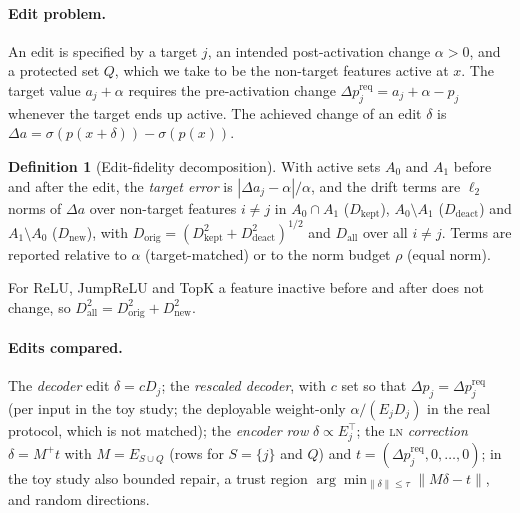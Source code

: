 \documentclass{article}
\theoremstyle{plain}
\theoremstyle{definition}
\newtheorem{definition}[theorem]{Definition}
\theoremstyle{remark}
\newcommand{\LN}{\textsc{ln}}
\begin{document}
\paragraph{Edit problem.}
An edit is specified by a target $j$, an intended post-activation change $\alpha>0$, and a
protected set $Q$, which we take to be the non-target features active at $x$. The target
value $a_j+\alpha$ requires the pre-activation change
$\Delta p_j^{\mathrm{req}} = a_j + \alpha - p_j$ whenever the target ends up active. The
achieved change of an edit $\delta$ is $\Delta a = \sigma(p(x+\delta)) - \sigma(p(x))$.

\begin{definition}[Edit-fidelity decomposition]
\label{def:fidelity}
With active sets $A_0$ and $A_1$ before and after the edit, the \emph{target error} is
$|\Delta a_j - \alpha|/\alpha$, and the drift terms are $\ell_2$ norms of $\Delta a$ over
non-target features $i\neq j$ in $A_0\cap A_1$ ($D_{\mathrm{kept}}$), $A_0\setminus A_1$
($D_{\mathrm{deact}}$) and $A_1\setminus A_0$ ($D_{\mathrm{new}}$), with
$D_{\mathrm{orig}} = (D_{\mathrm{kept}}^2 + D_{\mathrm{deact}}^2)^{1/2}$ and $D_{\mathrm{all}}$
over all $i\neq j$. Terms are reported relative to $\alpha$ (target-matched) or to the norm
budget $\rho$ (equal norm).
\end{definition}
For ReLU, JumpReLU and TopK a feature inactive before and after does not change, so
$D_{\mathrm{all}}^2 = D_{\mathrm{orig}}^2 + D_{\mathrm{new}}^2$.

\paragraph{Edits compared.} The \emph{decoder} edit $\delta = cD_j$; the \emph{rescaled
decoder}, with $c$ set so that $\Delta p_j = \Delta p_j^{\mathrm{req}}$ (per input in the toy
study; the deployable weight-only $\alpha/(E_jD_j)$ in the real protocol, which is not
matched); the \emph{encoder row} $\delta\propto E_j^{\top}$; the \LN{} \emph{correction}
$\delta = M^{+}t$ with $M = E_{S\cup Q}$ (rows for $S=\{j\}$ and $Q$) and
$t = (\Delta p_j^{\mathrm{req}},0,\dots,0)$; in the toy study also bounded repair, a trust
region $\arg\min_{\|\delta\|\le\tau}\|M\delta - t\|$, and random directions.
\end{document}
